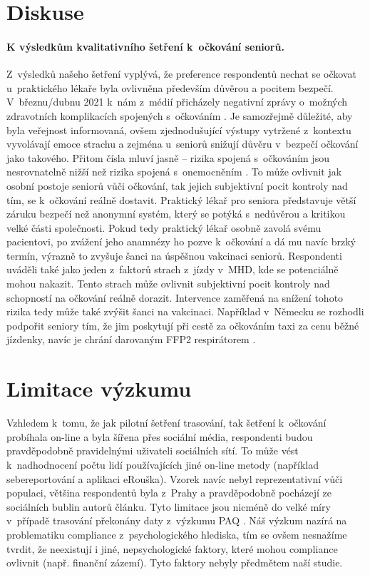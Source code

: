 \section*{Diskuse}

\paragraph*{K výsledkům kvalitativního šetření k~očkování seniorů.}
Z~výsledků našeho šetření vyplývá, že preference respondentů nechat se očkovat u~praktického lékaře byla ovlivněna především důvěrou a pocitem bezpečí. V~březnu/dubnu 2021 k~nám z~médií přicházely negativní zprávy o~možných zdravotních komplikacích spojených s~očkováním \cite{Svamberk2021,MinisterstvoZdravotnictviCR2021a}. Je samozřejmě důležité, aby byla ve\-řej\-nost informovaná, ovšem zjednodušující výstupy vytržené z~kontextu vyvolávají emoce strachu a zejména u~seniorů snižují důvěru v~bezpečí očkování jako takového. Přitom čísla mluví jasně – rizika spojená s~očkováním jsou nesrovnatelně nižší než rizika spojená s~onemocněním \cite{Statniustavprokontroluleciv2021}. 
To může ovlivnit jak osobní postoje seniorů vůči očkování, tak jejich subjektivní pocit kontroly nad tím, se k~očkování reálně dostavit. Praktický lékař pro seniora představuje větší záruku bezpečí než anonymní systém, který se potýká s~nedůvěrou a kritikou velké části společnosti. Pokud tedy praktický lékař osobně zavolá svému pacientovi, po zvážení jeho anamnézy ho pozve k~očkování a dá mu navíc brzký termín, výrazně to zvyšuje šanci na úspěšnou vakcinaci seniorů.
Respondenti uváděli také jako jeden z~faktorů strach z~jízdy v~MHD, kde se potenciálně mohou nakazit. Tento strach může ovlivnit subjektivní pocit kontroly nad schopností na očkování reálně dorazit. Intervence zaměřená na snížení tohoto rizika tedy může také zvýšit šanci na vakcinaci. Například v~Německu se rozhodli podpořit seniory tím, že jim poskytují při cestě za očkováním taxi za cenu běžné jízdenky, navíc je chrání darovaným FFP2 respirátorem \cite{Kreijger2021}.

\section*{Limitace výzkumu}

Vzhledem k~tomu, že jak pilotní šetření trasování, tak šetření k~očkování probíhala on-line a byla šířena přes sociální média, respondenti budou pravděpodobně pravidelnými uživateli sociálních sítí. To může vést k~nadhodnocení počtu lidí používajících jiné on-line metody (například sebereportování a aplikaci eRouška). 
Vzorek navíc nebyl reprezentativní vůči populaci, většina respondentů byla z~Prahy a pravděpodobně pocházejí ze sociálních bublin autorů článku.
Tyto limitace jsou nicméně do velké míry v~případě trasování překonány daty z~výzkumu PAQ \cite{Prokop2021a}.
Náš výzkum nazírá na problematiku compliance z~psychologického hlediska, tím se ovšem nesnažíme tvrdit, že neexistují i jiné, nepsychologické faktory, které mohou compliance ovlivnit (např. finanční zázemí). Tyto faktory nebyly předmětem naší studie.



